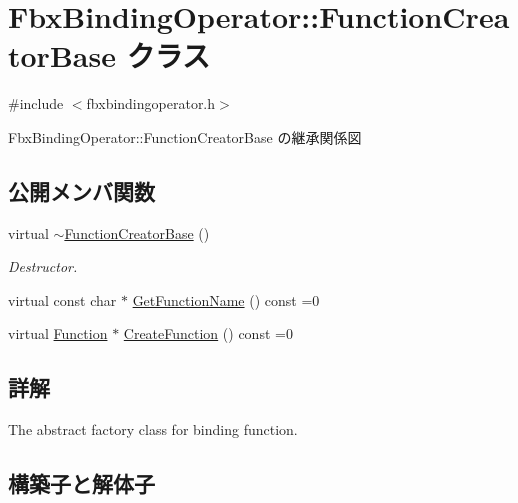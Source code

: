 \hypertarget{class_fbx_binding_operator_1_1_function_creator_base}{}\section{Fbx\+Binding\+Operator\+:\+:Function\+Creator\+Base クラス}
\label{class_fbx_binding_operator_1_1_function_creator_base}


{\ttfamily \#include $<$fbxbindingoperator.\+h$>$}



Fbx\+Binding\+Operator\+:\+:Function\+Creator\+Base の継承関係図
\subsection*{公開メンバ関数}
\begin{DoxyCompactItemize}
\item 
virtual \hyperlink{class_fbx_binding_operator_1_1_function_creator_base_af1836555f0af15087801bcd0ca25e977}{$\sim$\+Function\+Creator\+Base} ()
\begin{DoxyCompactList}\small\item\em Destructor. \end{DoxyCompactList}\item 
virtual const char $\ast$ \hyperlink{class_fbx_binding_operator_1_1_function_creator_base_a7a5ec0f9c376ce88b12cbfe171498913}{Get\+Function\+Name} () const =0
\item 
virtual \hyperlink{class_fbx_binding_operator_1_1_function}{Function} $\ast$ \hyperlink{class_fbx_binding_operator_1_1_function_creator_base_a092cb78156b31c356d929c3cfa9ff077}{Create\+Function} () const =0
\end{DoxyCompactItemize}


\subsection{詳解}
The abstract factory class for binding function. 

\subsection{構築子と解体子}
\mbox{\label{class_fbx_binding_operator_1_1_function_creator_base_af1836555f0af15087801bcd0ca25e977}} 
